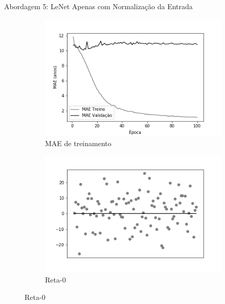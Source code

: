\begin{frame}{Abordagem 5: LeNet Apenas com Normalização da Entrada}
  \begin{figure}[hb!]
		\caption{Resultados do treinamento e teste da CNN LeNet de acordo com a Abordagem 5.}\label{fig:lenet-abordagem4}
		\begin{subfigure}[hb]{0.5\linewidth}
			\caption{MAE de treinamento}
			\includegraphics[width=\linewidth]{img/graficos/history/lenet/fig-history-abordagem-5-lenet-relu-mae.png}%
		\end{subfigure}%
		\begin{subfigure}[hb]{0.5\linewidth}
			\caption{Reta-0}
			\includegraphics[width=\linewidth]{img/graficos/reta0/lenet/fig-reta-0-abordagem-5-lenet-relu.png}%
		\end{subfigure}
	\end{figure}
\end{frame}

